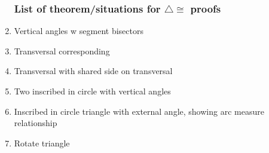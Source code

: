 \documentclass[12pt, twoside]{article}
\begin{document}
\begin{enumerate}
\newpage
\subsubsection*{List of theorem/situations for $\triangle \cong$ proofs}
  \item Vertical angles w segment bisectors
  \item Transversal corresponding
  \item Transversal with shared side on transversal
  \item Two inscribed in circle with vertical angles
  \item Inscribed in circle triangle with external angle, showing arc measure relationship
  \item Rotate triangle


\end{enumerate}
\end{document}
